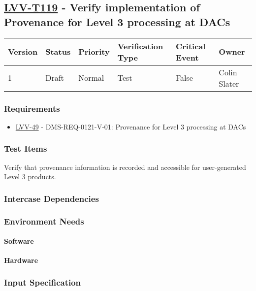 \subsection{\href{https://jira.lsstcorp.org/secure/Tests.jspa\#/testCase/LVV-T119}{LVV-T119}
    - Verify implementation of Provenance for Level 3 processing at DACs}\label{lvv-t119}

\begin{longtable}[]{llllll}
\toprule
Version & Status & Priority & Verification Type & Critical Event & Owner
\\\midrule
1 & Draft & Normal &
Test & False & Colin Slater
\\\bottomrule
\end{longtable}

\subsubsection{Requirements}
\begin{itemize}
\item \href{https://jira.lsstcorp.org/browse/LVV-49}{LVV-49} - DMS-REQ-0121-V-01: Provenance for Level 3 processing at DACs
\end{itemize}

\subsubsection{Test Items}
Verify that provenance information is recorded and accessible for
user-generated Level 3 products.



\subsubsection{Intercase Dependencies}

\subsubsection{Environment Needs}

\paragraph{Software}

\paragraph{Hardware}

\subsubsection{Input Specification}

